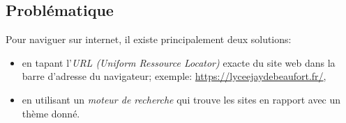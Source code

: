 \documentclass[a4paper,11pt]{article}
\begin{document}
\begin{Form}
\section{Problématique}
Pour naviguer sur internet, il existe principalement deux solutions:
\begin{itemize}
\item en tapant l'\emph{URL (Uniform Ressource Locator)} exacte du site web dans la barre d'adresse du navigateur; exemple: \mbox{\url{https://lyceejaydebeaufort.fr/}},
\item en utilisant un \emph{moteur de recherche} qui trouve les sites en rapport avec un thème donné.
\end{itemize}
\begin{center}
\end{center}

\end{Form}
\end{document}
